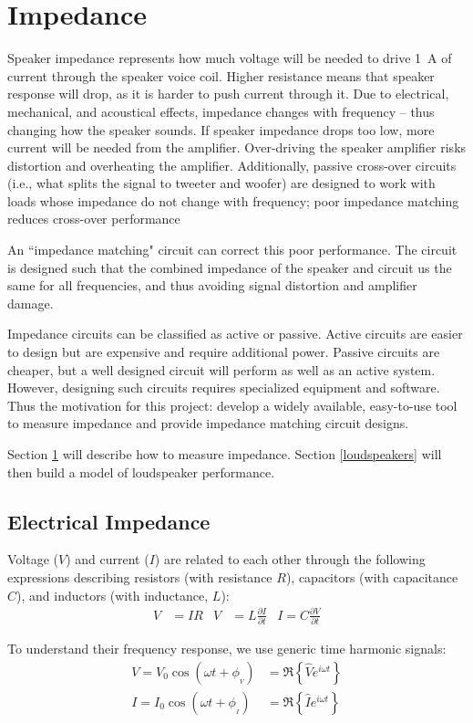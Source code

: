 \documentclass[10pt,letterpaper]{book}
\begin{document}
\section{Impedance}\label{Impedance}
Speaker impedance represents how much voltage will be needed to drive 1~A of current  through the speaker voice coil. Higher resistance means that speaker response will drop, as it is harder to push current through it. Due to electrical, mechanical, and acoustical effects, impedance changes with frequency -- thus changing how the speaker sounds. If speaker impedance drops too low, more current will be needed from the amplifier. Over-driving the speaker amplifier risks distortion and overheating the amplifier. Additionally, passive cross-over circuits (i.e., what splits the signal to tweeter and woofer) are designed to work with loads whose impedance do not change with frequency; poor impedance matching reduces cross-over performance

An ``impedance matching" circuit can correct this poor performance. The circuit is designed such that the combined impedance of the speaker and circuit us the same for all frequencies, and thus avoiding signal distortion and amplifier damage.

Impedance circuits can be classified as active or passive. Active circuits are easier to design but are expensive and require additional power. Passive circuits are cheaper, but a well designed circuit will perform as well as an active system. However, designing such circuits requires specialized equipment and software. Thus the motivation for this project: develop a widely available, easy-to-use tool to measure impedance and provide impedance matching circuit designs.

Section \ref{Impedance} will describe how to measure impedance. Section \ref{loudspeakers} will then build a model of loudspeaker performance.
\subsection{Electrical Impedance}
Voltage ($V$) and current ($I$) are related to each other through the following expressions describing resistors (with resistance $R$), capacitors (with capacitance $C$), and inductors (with inductance, $L$):
\begin{align}\label{electrical_eqs}
V&=IR & V&=L\frac{\partial I}{\partial t} & I=C\frac{\partial V}{\partial t}
\end{align}

To understand their frequency response, we use generic time harmonic signals:
\begin{align}\label{timeharmonic}
V=V_0\cos(\omega t + \phi_{_V})&=\Re{ \left\{ \hat{V}e^{i\omega t}\right\} }\\
I=I_0\cos(\omega t + \phi_{_I})&=\Re{ \left\{ \hat{I}e^{i\omega t}\right\} }
\end{align}
\end{document}

